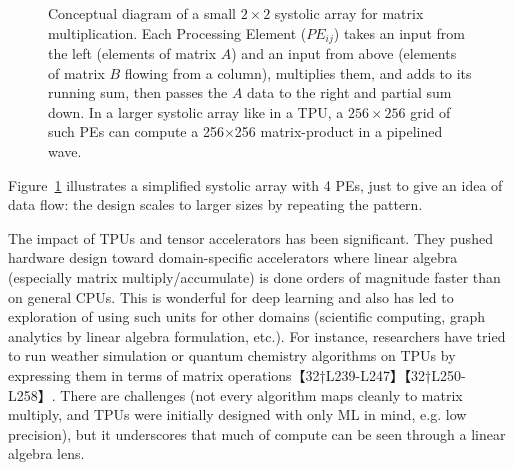 \begin{figure}[hbt]
\centering
{}
\caption{Conceptual diagram of a small $2\times2$ systolic array for matrix multiplication. Each Processing Element ($PE_{ij}$) takes an input from the left (elements of matrix $A$) and an input from above (elements of matrix $B$ flowing from a column), multiplies them, and adds to its running sum, then passes the $A$ data to the right and partial sum down. In a larger systolic array like in a TPU, a $256\times256$ grid of such PEs can compute a 256$\times$256 matrix-product in a pipelined wave.}
\label{systolic-fig}
\end{figure}

Figure~\ref{systolic-fig} illustrates a simplified systolic array with 4 PEs, just to give an idea of data flow: the design scales to larger sizes by repeating the pattern. 

The impact of TPUs and tensor accelerators has been significant. They pushed hardware design toward domain-specific accelerators where linear algebra (especially matrix multiply/accumulate) is done orders of magnitude faster than on general CPUs. This is wonderful for deep learning and also has led to exploration of using such units for other domains (scientific computing, graph analytics by linear algebra formulation, etc.). For instance, researchers have tried to run weather simulation or quantum chemistry algorithms on TPUs by expressing them in terms of matrix operations【32†L239-L247】【32†L250-L258】. There are challenges (not every algorithm maps cleanly to matrix multiply, and TPUs were initially designed with only ML in mind, e.g. low precision), but it underscores that much of compute can be seen through a linear algebra lens.

